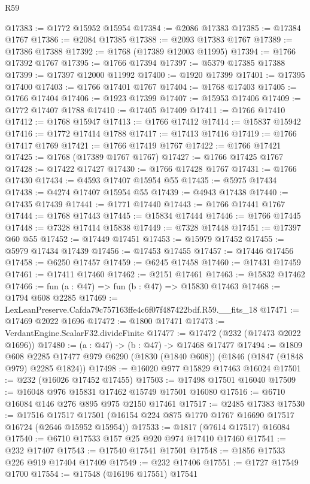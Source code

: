 \begin{lexlean}{R59}
\begin{coremodule}
@17383 := @1772 @15952 @15954
@17384 := @2086 @17383
@17385 := @17384 @1767
@17386 := @2084 @17385
@17388 := @2093 @17383 @1767
@17389 := @17386 @17388
@17392 := @1768 (@17389 @12003 @11995)
@17394 := @1766 @17392 @1767
@17395 := @1766 @17394
@17397 := @5379 @17385 @17388
@17399 := @17397 @12000 @11992
@17400 := @1920 @17399
@17401 := @17395 @17400
@17403 := @1766 @17401 @1767
@17404 := @1768 @17403
@17405 := @1766 @17404
@17406 := @1923 @17399
@17407 := @15953 @17406
@17409 := @1772 @17407 @1788
@17410 := @17405 @17409
@17411 := @1766 @17410
@17412 := @1768 @15947
@17413 := @1766 @17412
@17414 := @15837 @15942
@17416 := @1772 @17414 @1788
@17417 := @17413 @17416
@17419 := @1766 @17417 @1769
@17421 := @1766 @17419 @1767
@17422 := @1766 @17421
@17425 := @1768 (@17389 @1767 @1767)
@17427 := @1766 @17425 @1767
@17428 := @17422 @17427
@17430 := @1766 @17428 @1767
@17431 := @1766 @17430
@17434 := @4593 @17407 @15954 @55
@17435 := @5975 @17434
@17438 := @4274 @17407 @15954 @55
@17439 := @4943 @17438
@17440 := @17435 @17439
@17441 := @1771 @17440
@17443 := @1766 @17441 @1767
@17444 := @1768 @17443
@17445 := @15834 @17444
@17446 := @1766 @17445
@17448 := @7328 @17414 @15838
@17449 := @7328 @17448
@17451 := @17397 @60 @55
@17452 := @17449 @17451
@17453 := @15979 @17452
@17455 := @5979 @17434 @17439
@17456 := @17453 @17455
@17457 := @17446 @17456
@17458 := @6250 @17457
@17459 := @6245 @17458
@17460 := @17431 @17459
@17461 := @17411 @17460
@17462 := @2151 @17461
@17463 := @15832 @17462
@17466 := fun (a : @47) => fun (b : @47) => @15830 @17463
@17468 := @1794 @608 @2285
@17469 := LexLeanPreserve.Cafda79c757163ffe4c6f07f487422bdf.R59.__fits_18
@17471 := @17469 @2022 @1696
@17472 := @1800 @17471
@17473 := VerdantEngine.ScalarF32.divideFinite
@17477 := @17472 (@232 (@17473 @2022 @1696))
@17480 := (a : @47) -> (b : @47) -> @17468 @17477
@17494 := @1809
    @608
    @2285
    @17477
    @979
    @6290
    (@1830 (@1840 @608))
    (@1846 (@1847 (@1848 @979) @2285 @1824))
@17498 := @16020 @977 @15829 @17463 @16024
@17501 := @232 (@16026 @17452 @17455)
@17503 := @17498 @17501 @16040
@17509 := @16048 @976 @15831 @17462 @15749 @17501 @16080
@17516 := @6710 @16084 @146 @276 @895 @975 @2150 @17461
@17517 := @2485 @17383
@17530 := @17516
    @17517
    @17501
    (@16154 @224 @875 @1770 @1767 @16690 @17517 @16724 (@2646 @15952 @15954))
@17533 := @1817 (@7614 @17517) @16084
@17540 := @6710 @17533 @157 @25 @920 @974 @17410 @17460
@17541 := @232 @17407
@17543 := @17540 @17541 @17501
@17548 := @1856 @17533 @226 @919 @17404 @17409
@17549 := @232 @17406
@17551 := @1727 @17549 @1700
@17554 := @17548 (@16196 @17551) @17541

\end{coremodule}
\end{lexlean}
